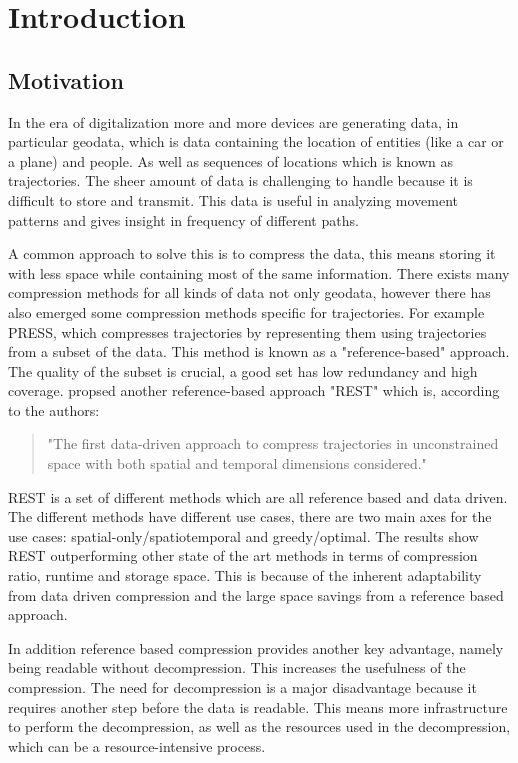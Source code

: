 \chapter{Introduction}
\section{Motivation}

In the era of digitalization more and more devices are generating data, in particular geodata, which is data containing the location of entities (like a car or a plane) and people. As well as sequences of locations which is known as trajectories. The sheer amount of data is challenging to handle because it is difficult to store and transmit. This data is useful in analyzing movement patterns and gives insight in frequency of different paths.

A common approach to solve this is to compress the data, this means storing it with less space while containing most of the same information. There exists many compression methods for all kinds of data not only geodata, however there has also emerged some compression methods specific for trajectories. For example PRESS, which compresses trajectories by representing them using trajectories from a subset of the data. This method is known as a "reference-based" approach. The quality of the subset is crucial, a good set has low redundancy and high coverage. \textcite{zhao2018rest} propsed another reference-based approach "REST" which is, according to the authors:
\begin{quote}
    "The first data-driven approach to compress trajectories in unconstrained space with both spatial and temporal dimensions considered."
\end{quote}
REST is a set of different methods which are all reference based and data driven. The different methods have different use cases, there are two main axes for the use cases: spatial-only/spatiotemporal and greedy/optimal. The results show REST outperforming other state of the art methods in terms of compression ratio, runtime and storage space. This is because of the inherent adaptability from data driven compression and the large space savings from a reference based approach.

In addition reference based compression provides another key advantage, namely being readable without decompression. This increases the usefulness of the compression. The need for decompression is a major disadvantage because it requires another step before the data is readable. This means more infrastructure to perform the decompression, as well as the resources used in the decompression, which can be a resource-intensive process.

